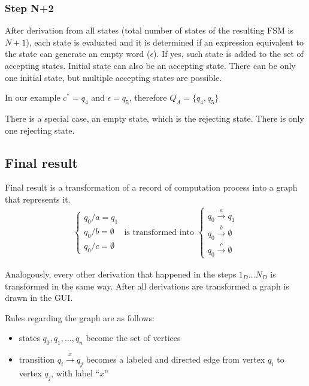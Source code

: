 \documentclass{article}
\begin{document}
\subsubsection{Step N+2}
After derivation from all states (total number of states of the resulting FSM is $N+1$), each state
is evaluated and it is determined if an expression equivalent to the state can generate an empty
word ($\epsilon$). If yes, such state is added to the set of accepting states. Initial state can
also be an accepting state. There can be only one initial state, but multiple accepting states are
possible.

In our example $c^* = q_4$ and $\epsilon = q_5$, therefore $Q_A = \{ q_4, q_5 \}$
 
There is a special case, an empty state, which is the rejecting state. There is only one rejecting
state.

\subsection{Final result}
Final result is a transformation of a record of computation process into a graph that represents it.
\begin{gather*}
\begin{cases}
q_0 / a = q_1 \\
q_0 / b = \emptyset \\
q_0 / c = \emptyset
\end{cases}
\mbox{ is transformed into }
\begin{cases}
q_0 \overset{a}{\rightarrow} q_1 \\
q_0 \overset{b}{\rightarrow} \emptyset \\
q_0 \overset{c}{\rightarrow} \emptyset
\end{cases}
\end{gather*}

Analogously, every other derivation that happened in the steps $1_D \ldots N_D$ is transformed in
the same way. After all derivations are transformed a graph is drawn in the GUI.

Rules regarding the graph are as follows:
\begin{itemize}

  \item states $q_0, q_1, \ldots, q_n$ become the set of vertices

  \item transition $q_i \overset{x}{\rightarrow} q_j$ becomes a labeled and directed edge from vertex $q_i$ to
  vertex $q_j$, with label ``$x$''

\end{itemize}
\end{document}
